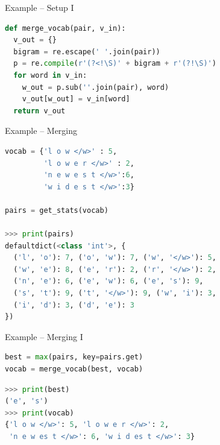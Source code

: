 \documentclass[11pt,compress,t,notes=noshow, xcolor=table]{beamer}
\begin{document}

\begin{vbframe}{Example -- Setup I}

\begin{lstlisting}[language=Python]
def merge_vocab(pair, v_in):
  v_out = {}
  bigram = re.escape(' '.join(pair))
  p = re.compile(r'(?<!\S)' + bigram + r'(?!\S)')
  for word in v_in:
    w_out = p.sub(''.join(pair), word)
    v_out[w_out] = v_in[word]
  return v_out
\end{lstlisting}

\end{vbframe}


\begin{vbframe}{Example -- Merging}

\begin{lstlisting}[language=Python]
vocab = {'l o w </w>' : 5, 
         'l o w e r </w>' : 2, 
         'n e w e s t </w>':6, 
         'w i d e s t </w>':3}

pairs = get_stats(vocab)

>>> print(pairs)
defaultdict(<class 'int'>, {
  ('l', 'o'): 7, ('o', 'w'): 7, ('w', '</w>'): 5, 
  ('w', 'e'): 8, ('e', 'r'): 2, ('r', '</w>'): 2, 
  ('n', 'e'): 6, ('e', 'w'): 6, ('e', 's'): 9, 
  ('s', 't'): 9, ('t', '</w>'): 9, ('w', 'i'): 3, 
  ('i', 'd'): 3, ('d', 'e'): 3
})
\end{lstlisting}

\end{vbframe}


\begin{vbframe}{Example -- Merging I}

\begin{lstlisting}[language=Python]
best = max(pairs, key=pairs.get)
vocab = merge_vocab(best, vocab)
\end{lstlisting}

\begin{lstlisting}[language=Python]
>>> print(best)
('e', 's')
>>> print(vocab)
{'l o w </w>': 5, 'l o w e r </w>': 2, 
 'n e w es t </w>': 6, 'w i d es t </w>': 3}
\end{lstlisting}

\end{vbframe}
\end{document}
